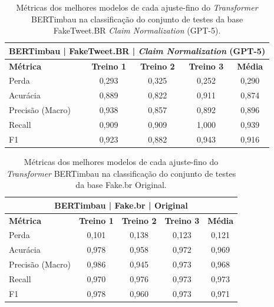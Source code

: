 \begin{table}[!htbp]
\centering
\begin{tabular}{l*4c}
\toprule
\multicolumn{5}{c}{\textbf{BERTimbau | FakeTweet.BR | \textit{Claim Normalization} (GPT-5)}} \\ 
\midrule
\textbf{Métrica} & \textbf{Treino 1} & \textbf{Treino 2} & \textbf{Treino 3} & \textbf{Média} \\ 
\midrule
Perda & 0,293 & 0,325 & 0,252 & 0,290 \\ 
Acurácia & 0,889 & 0,822 & 0,911 & 0,874 \\ 
Precisão (Macro) & 0,938 & 0,857 & 0,892 & 0,896 \\ 
Recall & 0,909 & 0,909 & 1,000 & 0,939 \\ 
F1 & 0,923 & 0,882 & 0,943 & 0,916 \\ 
\bottomrule
\end{tabular}
\caption{Métricas dos melhores modelos de cada ajuste-fino do \textit{Transformer} BERTimbau na classificação do conjunto de testes da base FakeTweet.BR \textit{Claim Normalization} (GPT-5).}
\end{table}

\begin{table}[!htbp]
\centering
\begin{tabular}{l*4c}
\toprule
\multicolumn{5}{c}{\textbf{BERTimbau | Fake.br | Original}} \\ 
\midrule
\textbf{Métrica} & \textbf{Treino 1} & \textbf{Treino 2} & \textbf{Treino 3} & \textbf{Média} \\ 
\midrule
Perda & 0,101 & 0,138 & 0,123 & 0,121 \\ 
Acurácia & 0,978 & 0,958 & 0,972 & 0,969 \\ 
Precisão (Macro) & 0,986 & 0,945 & 0,973 & 0,968 \\ 
Recall & 0,970 & 0,976 & 0,973 & 0,973 \\ 
F1 & 0,978 & 0,960 & 0,973 & 0,971 \\ 
\bottomrule
\end{tabular}
\caption{Métricas dos melhores modelos de cada ajuste-fino do \textit{Transformer} BERTimbau na classificação do conjunto de testes da base Fake.br Original.}
\end{table}

